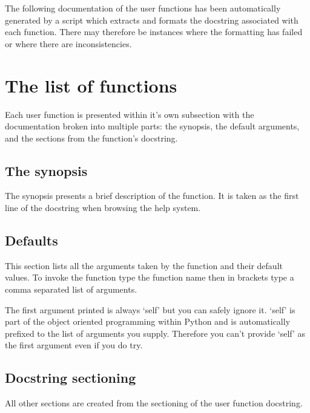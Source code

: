 The following documentation of the user functions has been automatically generated by a script which extracts and formats the docstring associated with each function.
There may therefore be instances where the formatting has failed or where there are inconsistencies.




\section{The list of functions}

Each user function is presented within it's own subsection with the documentation broken into multiple parts:  the synopsis, the default arguments, and the sections from the function's docstring.


\subsection{The synopsis}

The synopsis presents a brief description of the function.
It is taken as the first line of the docstring when browsing the help system.


\subsection{Defaults}

This section lists all the arguments taken by the function and their default values.
To invoke the function type the function name then in brackets type a comma separated list of arguments.

The first argument printed is always `self' but you can safely ignore it.
`self' is part of the object oriented programming within Python and is automatically prefixed to the list of arguments you supply.
Therefore you can't provide `self' as the first argument even if you do try.


\subsection{Docstring sectioning}

All other sections are created from the sectioning of the user function docstring.


\begin{latexonly}
   \newpage
   \raggedbottom
   \twocolumn
   {\scriptsize
   
   }
   \onecolumn
\end{latexonly}
\begin{htmlonly}
   
\end{htmlonly}
